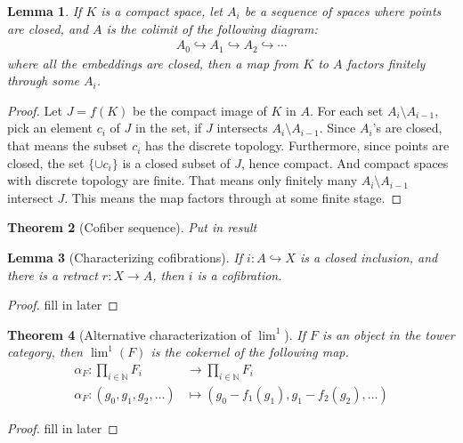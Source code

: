 \documentclass[12pt, notitlepage]{article}
\newtheorem{thm}{Theorem}[section]
\newtheorem{lem}[thm]{Lemma}
\theoremstyle{definition}
\begin{document}
\begin{lem}
  If $K$ is a compact space, let $A_i$ be a sequence of spaces where points are closed, and $A$ is
  the colimit of the following diagram:
  \begin{align*}
    A_0 \hookrightarrow A_1 \hookrightarrow A_2 \hookrightarrow \cdots
  \end{align*}
  where all the embeddings are closed, then a map from $K$ to $A$ factors finitely through some
  $A_i$.
\end{lem}

\begin{proof}
  Let $J = f(K)$ be the compact image of $K$ in $A$. For each set $A_i \setminus A_{i-1}$, pick an
  element $c_i$ of $J$ in the set, if $J$ intersects $A_i \setminus A_{i-1}$. Since $A_i$'s are
  closed, that means the subset $c_i$ has the discrete topology. Furthermore, since points are
  closed, the set $\{\cup c_i\}$ is a closed subset of $J$, hence compact. And compact spaces with
  discrete topology are finite. That means only finitely many $A_i \setminus A_{i-1}$ intersect $J$.
  This means the map factors through at some finite stage.
\end{proof}

\begin{thm}[Cofiber sequence]
  Put in result
\end{thm}

\begin{lem}[Characterizing cofibrations]
  If $i: A \hookrightarrow X$ is a closed inclusion, and there is a retract $r: X \to A$, then $i$
  is a cofibration.
\end{lem}

\begin{proof}
  fill in later
\end{proof}

\begin{thm}[Alternative characterization of $\lim^1$]
  If $F$ is an object in the tower category, then $\lim^1(F)$ is the cokernel of the following map.
  \begin{align*}
    \alpha_F : \prod_{i \in \mathbb{N}} F_i &\to \prod_{i \in \mathbb{N}} F_i \\
    \alpha_F : (g_0, g_1, g_2, \ldots) &\mapsto \left(g_0 - f_1(g_1), g_1 - f_2(g_2), \ldots \right)
  \end{align*}
\end{thm}

\begin{proof}
  fill in later
\end{proof}
\end{document}
